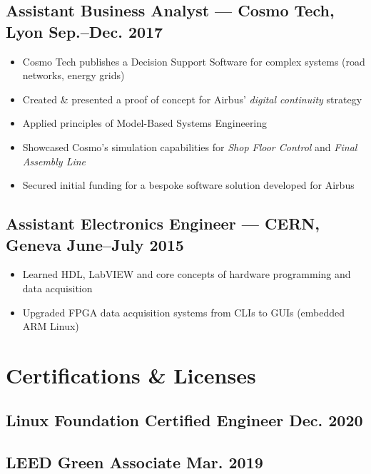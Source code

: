 \documentclass[10pt]{article}
\begin{document}
\subsection*{Assistant Business Analyst --- Cosmo Tech, Lyon \hfill Sep.--Dec. 2017}
\label{sec:org2e84851}

\begin{itemize}
\item Cosmo Tech publishes a Decision Support Software for complex systems (road
networks, energy grids)
\item Created \& presented a proof of concept for Airbus' \emph{digital continuity}
strategy
\item Applied principles of Model-Based Systems Engineering
\item Showcased Cosmo’s simulation capabilities for \emph{Shop Floor Control} and \emph{Final
Assembly Line}
\item Secured initial funding for a bespoke software solution developed for Airbus
\end{itemize}

\subsection*{Assistant Electronics Engineer --- CERN, Geneva \hfill June--July 2015}
\label{sec:org8764bd7}

\begin{itemize}
\item Learned HDL, LabVIEW and core concepts of hardware programming and data acquisition
\item Upgraded FPGA data acquisition systems from CLIs to GUIs (embedded ARM Linux)
\end{itemize}

\section*{Certifications \& Licenses}
\label{sec:orgc0df716}

\subsection*{Linux Foundation Certified Engineer \hfill Dec. 2020}
\label{sec:org4dce0e8}

\subsection*{LEED Green Associate \hfill Mar. 2019}
\label{sec:org61d6d08}
\end{document}
